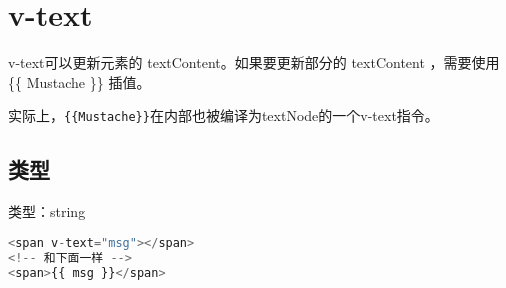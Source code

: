 \section{v-text}


v-text可以更新元素的 textContent。如果要更新部分的 textContent ，需要使用 \{\{ Mustache \}\} 插值。

实际上，\texttt{\{\{Mustache\}\}}在内部也被编译为textNode的一个v-text指令。

\subsection{类型}

\begin{compactitem}
\item 类型：string
\end{compactitem}


\begin{lstlisting}[language=JavaScript]
<span v-text="msg"></span>
<!-- 和下面一样 -->
<span>{{ msg }}</span>
\end{lstlisting}



\begin{lstlisting}[language=JavaScript]

\end{lstlisting}




\begin{lstlisting}[language=JavaScript]

\end{lstlisting}




\begin{lstlisting}[language=JavaScript]

\end{lstlisting}




\begin{lstlisting}[language=JavaScript]

\end{lstlisting}




\begin{lstlisting}[language=JavaScript]

\end{lstlisting}




\begin{lstlisting}[language=JavaScript]

\end{lstlisting}




